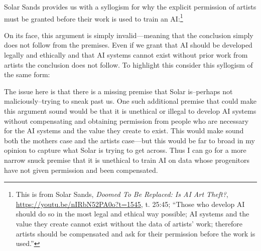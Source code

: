 \documentclass[11pt]{article}
\begin{document}
Solar Sands provides us with a syllogism for why the explicit permission of artists must be granted before their work is used to train an AI:\footnote{This is from Solar Sands, \emph{Doomed To Be Replaced: Is AI Art Theft?}, \url{https://youtu.be/nIRbN52PA0o?t=1545}, t. 25:45; ``Those who develop AI should do so in the most legal and ethical way possible; AI systems and the value they create cannot exist without the data of artists' work; therefore artists should be compensated and ask for their permission before the work is used.''}


On its face, this argument is simply invalid---meaning that the conclusion simply does not follow from the premises. Even if we grant that AI should be developed legally and ethically and that AI systems cannot exist without prior work from artists the conclusion does not follow. To highlight this consider this syllogism of the same form:


The issue here is that there is a missing premise that Solar is--perhaps not maliciously--trying to sneak past us. One such additional premise that could make this argument sound would be that it is unethical or illegal to develop AI systems without compensating and obtaining permission from people who are necessary for the AI systems and the value they create to exist. This would make sound both the mothers case and the artists case---but this would be far to broad in my opinion to capture what Solar is trying to get across. Thus I can go for a more narrow snuck premise that it is unethical to train AI on data whose progenitors have not given permission and been compensated.
\end{document}
